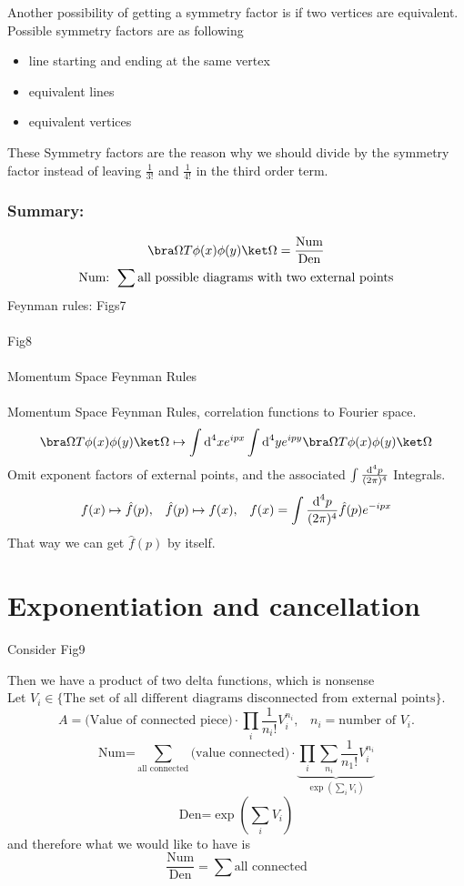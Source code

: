 \documentclass[]{scrartcl}
\begin{document}
Another possibility of getting a symmetry factor is if two vertices are equivalent. Possible symmetry factors are as following
\begin{itemize}
	\item line starting and ending at the same vertex
	\item equivalent lines
	\item equivalent vertices
\end{itemize}
These Symmetry factors are the reason why we should divide by the symmetry factor instead of leaving $\frac{1}{3!}$ and $\frac{1}{4!}$ in the third order term.
\subsubsection{Summary:}
\begin{gather}
	\bra\Omega T\phi(x)\phi(y)\ket\Omega = \frac{\text{Num}}{\text{Den}}\\
	\text{Num: } \sum \text{all possible diagrams with two external points}
\end{gather}
Feynman rules: Figs7\\\\

Fig8\\\\

Momentum Space Feynman Rules\\\\

Momentum Space Feynman Rules, correlation functions to Fourier space.
\begin{equation}
	\bra\Omega T\phi(x)\phi(y)\ket\Omega \mapsto \int \text d^4x e^{ipx} \int \text d^4y e^{ipy}\bra\Omega T\phi(x)\phi(y) \ket\Omega
\end{equation}
Omit exponent factors of external points, and the associated $\int\frac{\text d^4p}{(2\pi)^4}$ Integrals.
\begin{equation}
	f(x) \mapsto \hat f(p),\;\;\; \hat f(p) \mapsto f(x),\;\;\; f(x) = \int\frac{\text d^4p}{(2\pi)^4}\hat f(p) e^{-ipx}
\end{equation}
That way we can get $\hat f(p)$ by itself.

\section{Exponentiation and cancellation}
Consider Fig9

Then we have a product of two delta functions, which is nonsense\\
Let $V_i\in\{\text{The set of all different diagrams disconnected from external points}\}$. 
$$
A= \text{(Value of connected piece)}\cdot\prod_{i}\frac{1}{n_i!}V_i^{n_i},\;\;\; n_i = \text{number of $V_i$.}
$$
$$
\text{Num=} \sum_{\text{all connected}}\text{(value connected)}\cdot\underbrace{\prod_i\sum_{n_i}\frac{1}{n_1!}V_i^{n_i}}_{\exp(\sum_i V_i)}
$$
$$
\text{Den=} \exp(\sum_i V_i)
$$
and therefore what we would like to have is
$$
\frac{\text{Num}}{\text{Den}} = \sum\text{all connected}
$$
\end{document}
